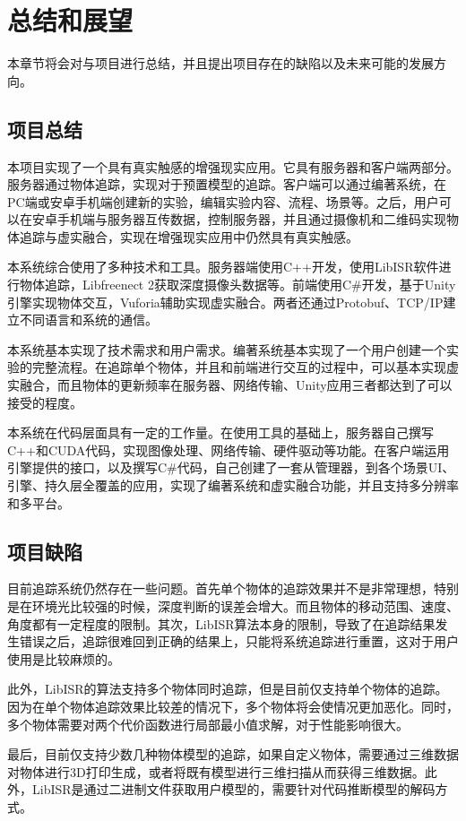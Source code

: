 \chapter{总结和展望}
\label{conclude}
本章节将会对与项目进行总结，并且提出项目存在的缺陷以及未来可能的发展方向。

\section{项目总结}
本项目实现了一个具有真实触感的增强现实应用。它具有服务器和客户端两部分。服务器通过物体追踪，实现对于预置模型的追踪。客户端可以通过编著系统，在PC端或安卓手机端创建新的实验，编辑实验内容、流程、场景等。之后，用户可以在安卓手机端与服务器互传数据，控制服务器，并且通过摄像机和二维码实现物体追踪与虚实融合，实现在增强现实应用中仍然具有真实触感。

本系统综合使用了多种技术和工具。服务器端使用C++开发，使用LibISR软件进行物体追踪，Libfreenect 2获取深度摄像头数据等。前端使用C\#开发，基于Unity引擎实现物体交互，Vuforia辅助实现虚实融合。两者还通过Protobuf、TCP/IP建立不同语言和系统的通信。

本系统基本实现了技术需求和用户需求。编著系统基本实现了一个用户创建一个实验的完整流程。在追踪单个物体，并且和前端进行交互的过程中，可以基本实现虚实融合，而且物体的更新频率在服务器、网络传输、Unity应用三者都达到了可以接受的程度。

本系统在代码层面具有一定的工作量。在使用工具的基础上，服务器自己撰写C++和CUDA代码，实现图像处理、网络传输、硬件驱动等功能。在客户端运用引擎提供的接口，以及撰写C\#代码，自己创建了一套从管理器，到各个场景UI、引擎、持久层全覆盖的应用，实现了编著系统和虚实融合功能，并且支持多分辨率和多平台。

\section{项目缺陷}
目前追踪系统仍然存在一些问题。首先单个物体的追踪效果并不是非常理想，特别是在环境光比较强的时候，深度判断的误差会增大。而且物体的移动范围、速度、角度都有一定程度的限制。其次，LibISR算法本身的限制，导致了在追踪结果发生错误之后，追踪很难回到正确的结果上，只能将系统追踪进行重置，这对于用户使用是比较麻烦的。

此外，LibISR的算法支持多个物体同时追踪，但是目前仅支持单个物体的追踪。因为在单个物体追踪效果比较差的情况下，多个物体将会使情况更加恶化。同时，多个物体需要对两个代价函数进行局部最小值求解，对于性能影响很大。

最后，目前仅支持少数几种物体模型的追踪，如果自定义物体，需要通过三维数据对物体进行3D打印生成，或者将既有模型进行三维扫描从而获得三维数据。此外，LibISR是通过二进制文件获取用户模型的，需要针对代码推断模型的解码方式。

